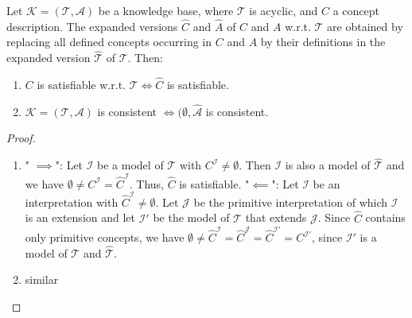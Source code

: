 \begin{prop}
Let  $\mathcal{K} = (\mathcal{T}, \mathcal{A})$ be a knowledge base, where $\mathcal{T}$ is acyclic, and $C$ a concept description.
The expanded versions $\widehat{C}$ and $\widehat{A}$ of $C$ and $A$ w.r.t. $\mathcal{T}$ are obtained by
replacing all defined concepts occurring in $C$ and $A$ by their definitions in the expanded version $\widehat{\mathcal{T}}$ of $\mathcal{T}$.
Then:
	\begin{enumerate}
		\item $C$ is satisfiable w.r.t. $\mathcal{T} \iff \widehat{C}$ is satisfiable.
		\item $\mathcal{K} = (\mathcal{T},\mathcal{A})$ is consistent $\iff (\emptyset,\widehat{\mathcal{A}}$ is consistent.
	\end{enumerate}
\end{prop}
\begin{proof}
	\begin{enumerate}
		\item " $ \implies$":\newline
			Let $\mathcal{I}$ be a model of $\mathcal{T}$ with $C^\mathcal{I} \neq \emptyset$.
			Then $\mathcal{I}$ is also a model of $\widehat{\mathcal{T}}$ and we have $\emptyset \neq C^\mathcal{I} = \widehat{C}^\mathcal{I}$.
			Thus, $\widehat{C}$ is satisfiable. \newline
			"$ \impliedby$": \newline
			Let $\mathcal{I}$ be an interpretation with $\widehat{C}^{\mathcal{I}} \neq \emptyset$.
			Let $\mathcal{J}$ be the primitive interpretation of which $\mathcal{I}$ is an extension
			and let $\mathcal{I}'$ be the model of $\mathcal{T}$ that extends $\mathcal{J}$.
			Since $\widehat{C}$ contains only primitive concepts,
			we have $\emptyset \neq \widehat{C}^{\mathcal{I}} = \widehat{C}^\mathcal{J} = \widehat{C}^{\mathcal{I'}} = C^{\mathcal{I'}}$,
			since $\mathcal{I}'$ is a model of $\mathcal{T}$ and $\widehat{\mathcal{T}}$.
		\item similar
			\qedhere
	\end{enumerate}
\end{proof}
\newpage
